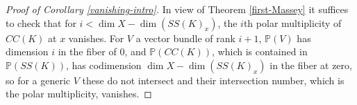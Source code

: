 \begin{proof}[Proof of Corollary \ref{vanishing-intro}] In view of Theorem \ref{first-Massey} it suffices to check that for $i< \dim X - \dim (SS(K)_x)$, the $i$th polar multiplicity of $CC(K)$ at $x$ vanishes.  For $V$ a vector bundle of rank $i+1$, $\mathbb P(V)$ has dimension $i$ in the fiber of $0$, and $\mathbb P( CC(K))$, which is contained in $\mathbb P( SS(K))$, has codimension $\dim X - \dim (SS(K)_x)$ in the fiber at zero, so for a generic $V$ these do not intersect and their intersection number, which is the polar multiplicity, vanishes. \end{proof}
